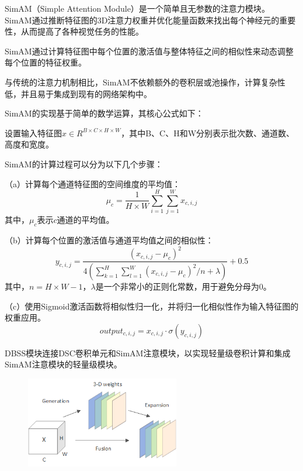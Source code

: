SimAM（Simple Attention Module）是一个简单且无参数的注意力模块\cite{simam}。 
SimAM通过推断特征图的3D注意力权重并优化能量函数来找出每个神经元的重要性，从而提高了各种视觉任务的性能。

SimAM通过计算特征图中每个位置的激活值与整体特征之间的相似性来动态调整每个位置的特征权重。

与传统的注意力机制相比，SimAM不依赖额外的卷积层或池操作，计算复杂性低，并且易于集成到现有的网络架构中。

SimAM的实现基于简单的数学运算，其核心公式如下：

设置输入特征图$x\in{R^{{B}\times{C}\times{H}\times{W}}}$，其中B、C、H和W分别表示批次数、通道数、高度和宽度。

SimAM的计算过程可以分为以下几个步骤：

（a）计算每个通道特征图的空间维度的平均值：
\begin{equation}
    \mu_c = \frac{1}{{H}\times{W}}\sum\limits_{i=1}^{H}\sum\limits_{j=1}^{W}x_{c,i,j}
\end{equation}
其中，$\mu_c$表示$c$通道的平均值。

（b）计算每个位置的激活值与通道平均值之间的相似性：
\begin{equation}
    y_{c,i,j} = \frac{(x_{c,i,j}-\mu_c)^2}{4\left(\sum_{k=1}^{H}\sum_{l=1}^{W}(x_{c,i,j}-\mu_c)^2/n+\lambda \right)}+0.5
\end{equation}
其中，$n={H}\times{W}-1$，$\lambda$是一个非常小的正则化常数，用于避免分母为$0$。

（c）使用Sigmoid激活函数将相似性归一化，并将归一化相似性作为输入特征图的权重应用。
\begin{equation}
    output_{c,i,j} = x_{c,i,j} \cdot \sigma(y_{c,i,j})
\end{equation}

DBSS模块连接DSC卷积单元和SimAM注意模块，以实现轻量级卷积计算和集成SimAM注意模块的轻量级模块。

\begin{figure}[htbp]
    \centering
    \includegraphics[width=0.6\textwidth]{../figure/SimAM.png}
    \captionsetup{font=footnotesize}
    \label{fig:SimAM}
\end{figure}

